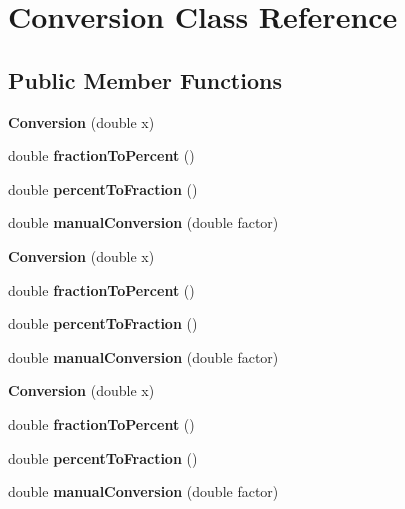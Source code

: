 \hypertarget{class_conversion}{}\section{Conversion Class Reference}
\label{class_conversion}
\subsection*{Public Member Functions}
\begin{DoxyCompactItemize}
\item 
\mbox{\label{class_conversion_a243e6526b29129f9efa4472f9d2204dd}} 
{\bfseries Conversion} (double x)
\item 
\mbox{\label{class_conversion_a270ff9a3d0a272d66355b54d02ef5d2a}} 
double {\bfseries fraction\+To\+Percent} ()
\item 
\mbox{\label{class_conversion_a90bf6eed9ff6c44526fae3eaf30eb572}} 
double {\bfseries percent\+To\+Fraction} ()
\item 
\mbox{\label{class_conversion_a68d00e9c4a2e64eedca5151c566d0c3f}} 
double {\bfseries manual\+Conversion} (double factor)
\item 
\mbox{\label{class_conversion_a243e6526b29129f9efa4472f9d2204dd}} 
{\bfseries Conversion} (double x)
\item 
\mbox{\label{class_conversion_a270ff9a3d0a272d66355b54d02ef5d2a}} 
double {\bfseries fraction\+To\+Percent} ()
\item 
\mbox{\label{class_conversion_a90bf6eed9ff6c44526fae3eaf30eb572}} 
double {\bfseries percent\+To\+Fraction} ()
\item 
\mbox{\label{class_conversion_a68d00e9c4a2e64eedca5151c566d0c3f}} 
double {\bfseries manual\+Conversion} (double factor)
\item 
\mbox{\label{class_conversion_a243e6526b29129f9efa4472f9d2204dd}} 
{\bfseries Conversion} (double x)
\item 
\mbox{\label{class_conversion_a270ff9a3d0a272d66355b54d02ef5d2a}} 
double {\bfseries fraction\+To\+Percent} ()
\item 
\mbox{\label{class_conversion_a90bf6eed9ff6c44526fae3eaf30eb572}} 
double {\bfseries percent\+To\+Fraction} ()
\item 
\mbox{\label{class_conversion_a68d00e9c4a2e64eedca5151c566d0c3f}} 
double {\bfseries manual\+Conversion} (double factor)
\end{DoxyCompactItemize}


